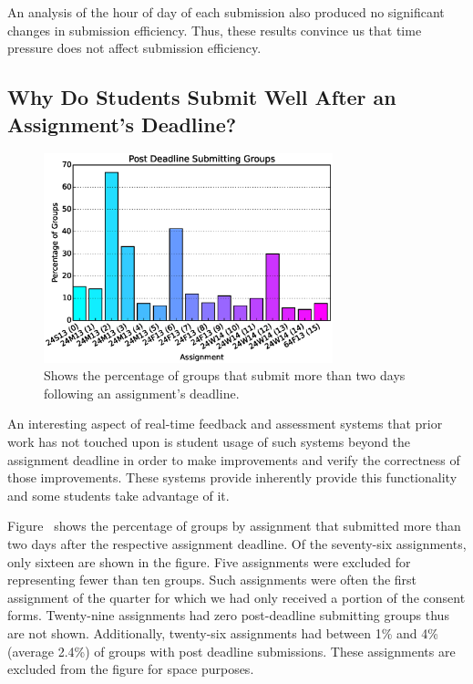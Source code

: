An analysis of the hour of day of each submission also produced no significant
changes in submission efficiency. Thus, these results convince us that time
pressure does not affect submission efficiency.

\subsection{Why Do Students Submit Well After an Assignment's Deadline?}

\begin{figure}[!t]
\centering
\includegraphics[width=3.3in]{graphs/Post_Deadline_Submitting_Groups.eps}
\caption{Shows the percentage of groups that submit more than two days
  following an assignment's deadline.}
\end{figure}

An interesting aspect of real-time feedback and assessment systems that prior
work has not touched upon is student usage of such systems beyond the
assignment deadline in order to make improvements and verify the correctness of
those improvements. These systems provide inherently provide this functionality
and some students take advantage of it.

Figure~ shows the percentage of groups by assignment that
submitted more than two days after the respective assignment deadline. Of the
seventy-six assignments, only sixteen are shown in the figure. Five assignments
were excluded for representing fewer than ten groups. Such assignments were
often the first assignment of the quarter for which we had only received a
portion of the consent forms. Twenty-nine assignments had zero post-deadline
submitting groups thus are not shown. Additionally, twenty-six assignments had
between 1\% and 4\% (average 2.4\%) of groups with post deadline
submissions. These assignments are excluded from the figure for space purposes.

